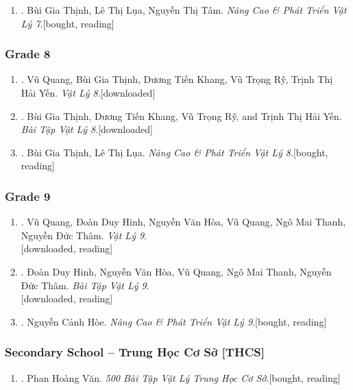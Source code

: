 \documentclass{article}
\begin{document}
\begin{enumerate}
	\item \cite{Thinh_Lua_ncpt_Vat_Ly_7}. Bùi Gia Thịnh, Lê Thị Lụa, Nguyễn Thị Tâm. \textit{Nâng Cao \& Phát Triển Vật Lý 7}.\hfill\textsf{[bought, reading]}
\end{enumerate}

\subsubsection{Grade 8}

\begin{enumerate}
	\item \cite{SGK_Vat_Ly_8}. Vũ Quang, Bùi Gia Thịnh, Dương Tiến Khang, Vũ Trọng Rỹ, Trịnh Thị Hải Yến. \textit{Vật Lý 8}.\hfill\textsf{[downloaded]}
	\item \cite{SBT_Vat_Ly_8}. Bùi Gia Thịnh, Dương Tiến Khang, Vũ Trọng Rỹ, and Trịnh Thị Hải Yến. \textit{Bài Tập Vật Lý 8}.\hfill\textsf{[downloaded]}
	\item \cite{Thinh_Lua_ncpt_Vat_Ly_8}. Bùi Gia Thịnh, Lê Thị Lụa. \textit{Nâng Cao \& Phát Triển Vật Lý 8}.\hfill\textsf{[bought, reading]}
\end{enumerate}

\subsubsection{Grade 9}

\begin{enumerate}
	\item \cite{SGK_Vat_Ly_9}. Vũ Quang, Đoàn Duy Hinh, Nguyễn Văn Hòa, Vũ Quang, Ngô Mai Thanh, Nguyễn Đức Thâm. \textit{Vật Lý 9}.\\\mbox{}\hfill\textsf{[downloaded, reading]}
	\item \cite{SBT_Vat_Ly_9}. Đoàn Duy Hinh, Nguyễn Văn Hòa, Vũ Quang, Ngô Mai Thanh, Nguyễn Đức Thâm. \textit{Bài Tập Vật Lý 9}.\\\mbox{}\hfill\textsf{[downloaded, reading]}
	\item \cite{Hoe_Vat_Ly_9}. Nguyễn Cảnh Hòe. \textit{Nâng Cao \& Phát Triển Vật Lý 9}.\hfill\textsf{[bought, reading]}
\end{enumerate}

\subsubsection{Secondary School -- Trung Học Cơ Sở [THCS]}

\begin{enumerate}
	\item \cite{Van_500_BT_Vat_Ly_THCS}. Phan Hoàng Văn. \textit{500 Bài Tập Vật Lý Trung Học Cơ Sở}.\hfill\textsf{[bought, reading]}
\end{enumerate}
\end{document}
